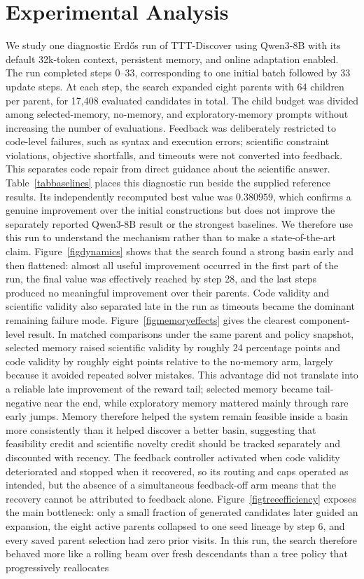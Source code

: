 \documentclass{article}
\begin{document}
\section{Experimental Analysis}
\label{secexperiments}

We study one diagnostic Erd\H{o}s run of TTT-Discover using Qwen3-8B with its default 32k-token context, persistent memory, and online adaptation enabled. The run completed steps 0--33, corresponding to one initial batch followed by 33 update steps. At each step, the search expanded eight parents with 64 children per parent, for 17,408 evaluated candidates in total. The child budget was divided among selected-memory, no-memory, and exploratory-memory prompts without increasing the number of evaluations. Feedback was deliberately restricted to code-level failures, such as syntax and execution errors; scientific constraint violations, objective shortfalls, and timeouts were not converted into feedback. This separates code repair from direct guidance about the scientific answer. Table~\ref{tabbaselines} places this diagnostic run beside the supplied reference results. Its independently recomputed best value was $0.380959$, which confirms a genuine improvement over the initial constructions but does not improve the separately reported Qwen3-8B result or the strongest baselines. We therefore use this run to understand the mechanism rather than to make a state-of-the-art claim. Figure~\ref{figdynamics} shows that the search found a strong basin early and then flattened: almost all useful improvement occurred in the first part of the run, the final value was effectively reached by step 28, and the last steps produced no meaningful improvement over their parents. Code validity and scientific validity also separated late in the run as timeouts became the dominant remaining failure mode. Figure~\ref{figmemoryeffects} gives the clearest component-level result. In matched comparisons under the same parent and policy snapshot, selected memory raised scientific validity by roughly 24 percentage points and code validity by roughly eight points relative to the no-memory arm, largely because it avoided repeated solver mistakes. This advantage did not translate into a reliable late improvement of the reward tail; selected memory became tail-negative near the end, while exploratory memory mattered mainly through rare early jumps. Memory therefore helped the system remain feasible inside a basin more consistently than it helped discover a better basin, suggesting that feasibility credit and scientific novelty credit should be tracked separately and discounted with recency. The feedback controller activated when code validity deteriorated and stopped when it recovered, so its routing and caps operated as intended, but the absence of a simultaneous feedback-off arm means that the recovery cannot be attributed to feedback alone. Figure~\ref{figtreeefficiency} exposes the main bottleneck: only a small fraction of generated candidates later guided an expansion, the eight active parents collapsed to one seed lineage by step 6, and every saved parent selection had zero prior visits. In this run, the search therefore behaved more like a rolling beam over fresh descendants than a tree policy that progressively reallocates 
\end{document}
